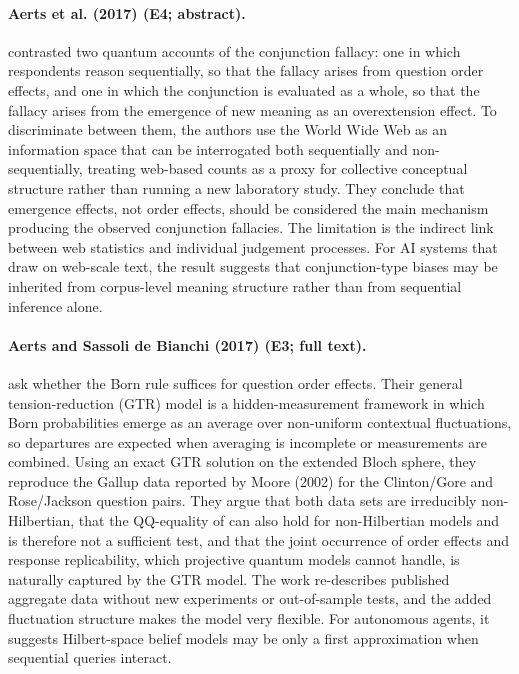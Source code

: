 \documentclass[10pt,a4paper]{article}
\begin{document}
\paragraph{Aerts et al. (2017) (E4; abstract).} \citet{Aerts2017} contrasted two quantum accounts of the conjunction fallacy: one in which respondents reason sequentially, so that the fallacy arises from question order effects, and one in which the conjunction is evaluated as a whole, so that the fallacy arises from the emergence of new meaning as an overextension effect. To discriminate between them, the authors use the World Wide Web as an information space that can be interrogated both sequentially and non-sequentially, treating web-based counts as a proxy for collective conceptual structure rather than running a new laboratory study. They conclude that emergence effects, not order effects, should be considered the main mechanism producing the observed conjunction fallacies. The limitation is the indirect link between web statistics and individual judgement processes. For AI systems that draw on web-scale text, the result suggests that conjunction-type biases may be inherited from corpus-level meaning structure rather than from sequential inference alone.

\paragraph{Aerts and Sassoli de Bianchi (2017) (E3; full text).} \citet{Aerts2017b} ask whether the Born rule suffices for question order effects. Their general tension-reduction (GTR) model is a hidden-measurement framework in which Born probabilities emerge as an average over non-uniform contextual fluctuations, so departures are expected when averaging is incomplete or measurements are combined. Using an exact GTR solution on the extended Bloch sphere, they reproduce the Gallup data reported by Moore (2002) for the Clinton/Gore and Rose/Jackson question pairs. They argue that both data sets are irreducibly non-Hilbertian, that the QQ-equality of \citep{Wang2014} can also hold for non-Hilbertian models and is therefore not a sufficient test, and that the joint occurrence of order effects and response replicability, which projective quantum models cannot handle, is naturally captured by the GTR model. The work re-describes published aggregate data without new experiments or out-of-sample tests, and the added fluctuation structure makes the model very flexible. For autonomous agents, it suggests Hilbert-space belief models may be only a first approximation when sequential queries interact.
\end{document}
